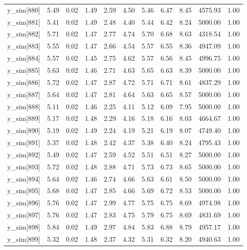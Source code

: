 \begin{table}[ht]
\begin{tabular}{rrrrrrrrrrr}
  y\_sim[880] & 5.49 & 0.02 & 1.49 & 2.59 & 4.50 & 5.46 & 6.47 & 8.45 & 4575.93 & 1.00 \\ 
  y\_sim[881] & 5.41 & 0.02 & 1.49 & 2.48 & 4.40 & 5.44 & 6.42 & 8.24 & 5000.00 & 1.00 \\ 
  y\_sim[882] & 5.71 & 0.02 & 1.47 & 2.77 & 4.74 & 5.70 & 6.68 & 8.63 & 4318.54 & 1.00 \\ 
  y\_sim[883] & 5.55 & 0.02 & 1.47 & 2.66 & 4.54 & 5.57 & 6.55 & 8.36 & 4947.09 & 1.00 \\ 
  y\_sim[884] & 5.57 & 0.02 & 1.45 & 2.75 & 4.62 & 5.57 & 6.56 & 8.45 & 4996.75 & 1.00 \\ 
  y\_sim[885] & 5.63 & 0.02 & 1.46 & 2.71 & 4.63 & 5.65 & 6.63 & 8.39 & 5000.00 & 1.00 \\ 
  y\_sim[886] & 5.72 & 0.02 & 1.47 & 2.87 & 4.72 & 5.71 & 6.71 & 8.61 & 4837.29 & 1.00 \\ 
  y\_sim[887] & 5.64 & 0.02 & 1.47 & 2.81 & 4.64 & 5.63 & 6.65 & 8.57 & 5000.00 & 1.00 \\ 
  y\_sim[888] & 5.11 & 0.02 & 1.46 & 2.25 & 4.11 & 5.12 & 6.09 & 7.95 & 5000.00 & 1.00 \\ 
  y\_sim[889] & 5.17 & 0.02 & 1.48 & 2.29 & 4.16 & 5.18 & 6.16 & 8.03 & 4664.67 & 1.00 \\ 
  y\_sim[890] & 5.19 & 0.02 & 1.49 & 2.24 & 4.19 & 5.21 & 6.19 & 8.07 & 4749.40 & 1.00 \\ 
  y\_sim[891] & 5.37 & 0.02 & 1.48 & 2.42 & 4.37 & 5.38 & 6.40 & 8.24 & 4795.43 & 1.00 \\ 
  y\_sim[892] & 5.49 & 0.02 & 1.47 & 2.59 & 4.52 & 5.51 & 6.51 & 8.27 & 5000.00 & 1.00 \\ 
  y\_sim[893] & 5.72 & 0.02 & 1.48 & 2.88 & 4.71 & 5.73 & 6.73 & 8.65 & 5000.00 & 1.00 \\ 
  y\_sim[894] & 5.64 & 0.02 & 1.46 & 2.74 & 4.66 & 5.63 & 6.61 & 8.50 & 5000.00 & 1.00 \\ 
  y\_sim[895] & 5.68 & 0.02 & 1.47 & 2.85 & 4.66 & 5.69 & 6.72 & 8.53 & 5000.00 & 1.00 \\ 
  y\_sim[896] & 5.76 & 0.02 & 1.47 & 2.99 & 4.77 & 5.75 & 6.75 & 8.69 & 4974.98 & 1.00 \\ 
  y\_sim[897] & 5.76 & 0.02 & 1.47 & 2.83 & 4.75 & 5.79 & 6.75 & 8.69 & 4831.69 & 1.00 \\ 
  y\_sim[898] & 5.84 & 0.02 & 1.49 & 2.97 & 4.84 & 5.83 & 6.88 & 8.79 & 4957.17 & 1.00 \\ 
  y\_sim[899] & 5.32 & 0.02 & 1.48 & 2.37 & 4.32 & 5.31 & 6.32 & 8.20 & 4940.63 & 1.00 \\ 

\end{tabular}
\end{table}
